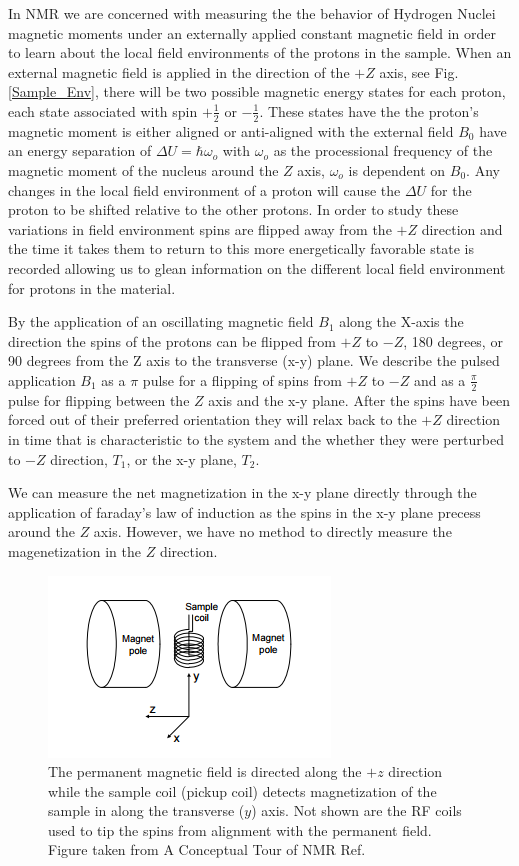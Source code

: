 \documentclass[11pt,letterpaper]{article}
\begin{document}
In NMR we are concerned with measuring the the behavior of Hydrogen Nuclei magnetic moments under an externally applied constant magnetic field in order to learn about the local field environments of the protons in the sample. When an external magnetic field is applied in the direction of the $+Z$ axis, see Fig. \ref{Sample_Env}, there will be two possible magnetic energy states for each proton, each state associated with spin $+\frac{1}{2}$ or $-\frac{1}{2}$. These states have the the proton's magnetic moment is either aligned or anti-aligned with the external field $B_0$ have an energy separation of $\Delta U=\hbar\omega_o$ with $\omega_o$ as the processional frequency of the magnetic moment of the nucleus around the $Z$ axis, $\omega_o$ is dependent on $B_0$. Any changes in the local field environment of a proton will cause the $\Delta U$ for the proton to be shifted relative to the other protons. In order to study these variations in field environment spins are flipped away from the $+Z$ direction and the time it takes them to return to this more energetically favorable state is recorded allowing us to glean information on the different local field environment for protons in the material.

By the application of an oscillating magnetic field $B_1$ along the X-axis the direction the spins of the protons can be flipped from $+Z$ to $-Z$, 180 degrees, or 90 degrees from the Z axis to the transverse (x-y) plane. We describe the pulsed application $B_1$ as a $\pi$ pulse for a flipping of spins from $+Z$ to $-Z$ and as a $\frac{\pi}{2}$ pulse for flipping between the $Z$ axis and the x-y plane. After the spins have been forced out of their preferred orientation they will relax back to the $+Z$ direction in time that is characteristic to the system and the whether they were perturbed to $-Z$ direction, $T_1$, or the x-y plane, $T_2$.

We can measure the net magnetization in the x-y plane directly through the application of faraday's law of induction as the spins in the x-y plane precess around the $Z$ axis. However, we have no method to directly measure the magenetization in the $Z$ direction.
\begin{figure}[h!]
  \centering
      \includegraphics[scale=.4]{Sample_Env.png}
      \caption{The permanent magnetic field is directed along the $+z$ direction while the sample coil (pickup coil) detects magnetization of the sample in along the transverse ($y$) axis. Not shown are the RF coils used to tip the spins from alignment with the permanent field. Figure taken from A Conceptual Tour of NMR Ref. \cite{Concept_Tour}}
      \label{fig:Sample_Env}
\end{figure}
\end{document}
